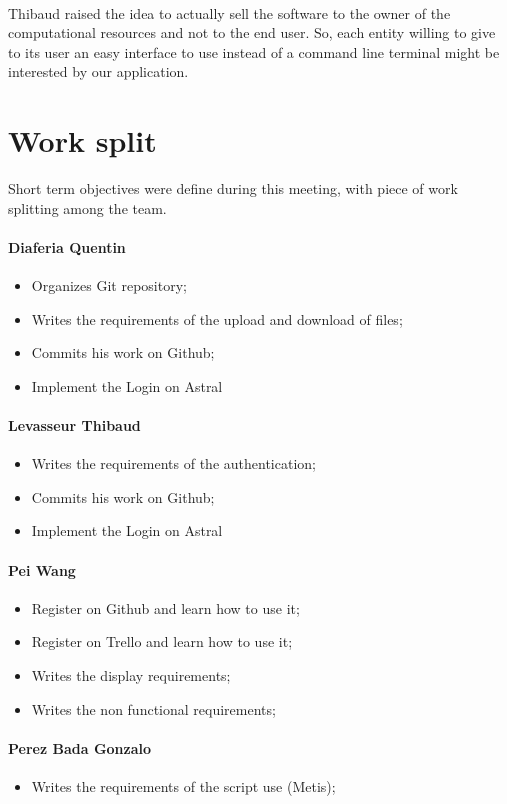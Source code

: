\documentclass{../resources/cranfieldChart}
\begin{document}
\paragraph{}Thibaud raised the idea to actually sell the software to the owner of the computational resources and not to the end user. So, each entity willing to give to its user an easy interface to use instead of a command line terminal might be interested by our application.


\section*{Work split}
Short term objectives were define during this meeting, with piece of work splitting among the team.

\paragraph{Diaferia Quentin}
\begin{itemize}
	\item Organizes Git repository;
	\item Writes  the requirements of the upload and download of files;
	\item Commits his work on Github;
	\item Implement the Login on Astral
\end{itemize}

\paragraph{Levasseur Thibaud}
\begin{itemize}
	\item Writes  the requirements of the authentication;
	\item Commits his work on Github;
	\item Implement the Login on Astral
\end{itemize}

\paragraph{Pei Wang}
\begin{itemize}
	\item Register on Github and learn how to use it;
	\item Register on Trello and learn how to use it;
	\item Writes  the display requirements;
	\item Writes  the non functional requirements;

\end{itemize}

\paragraph{Perez Bada Gonzalo}
\begin{itemize}
	\item Writes  the requirements of the script use (Metis);
\end{itemize}
\end{document}
